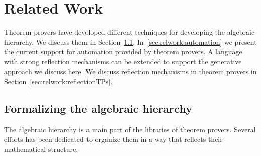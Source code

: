 \chapter{Related Work}
\label{ch:relatedwork}

Theorem provers have developed different techniques for developing the algebraic hierarchy. We discuss them in Section~\ref{sec:relwork:hierarchy}. In~\ref{sec:relwork:automation} we present the current support for automation provided by theorem provers. 
A language with strong reflection mechanisms can be extended to support the generative approach we discuss here. We discuss reflection mechanisms in theorem provers in Section~\ref{sec:relwork:reflectionTPs}. 

\section{Formalizing the algebraic hierarchy}
\label{sec:relwork:hierarchy}
The algebraic hierarchy is a main part of the libraries of theorem provers. Several efforts has been dedicated to organize them in a way that reflects their mathematical structure. 

